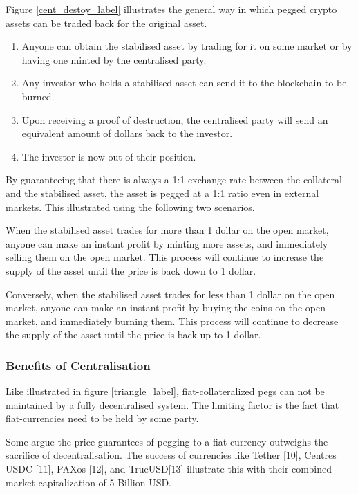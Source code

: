 \documentclass[english,]{IEEEtran}
\providecommand{\tightlist}{%
  \setlength{\itemsep}{0pt}\setlength{\parskip}{0pt}}
\begin{document}
Figure \ref{cent_destoy_label} illustrates the general way in which
pegged crypto assets can be traded back for the original asset.

\begin{enumerate}
\def\labelenumi{\arabic{enumi}.}
\setcounter{enumi}{-1}
\tightlist
\item
  Anyone can obtain the stabilised asset by trading for it on some
  market or by having one minted by the centralised party.
\item
  Any investor who holds a stabilised asset can send it to the
  blockchain to be burned.
\item
  Upon receiving a proof of destruction, the centralised party will send
  an equivalent amount of dollars back to the investor.
\item
  The investor is now out of their position.
\end{enumerate}

By guaranteeing that there is always a 1:1 exchange rate between the
collateral and the stabilised asset, the asset is pegged at a 1:1 ratio
even in external markets. This illustrated using the following two
scenarios.

When the stabilised asset trades for more than 1 dollar on the open
market, anyone can make an instant profit by minting more assets, and
immediately selling them on the open market. This process will continue
to increase the supply of the asset until the price is back down to 1
dollar.

Conversely, when the stabilised asset trades for less than 1 dollar on
the open market, anyone can make an instant profit by buying the coins
on the open market, and immediately burning them. This process will
continue to decrease the supply of the asset until the price is back up
to 1 dollar.

\hypertarget{benefits-of-centralisation}{%
\subsubsection{Benefits of
Centralisation}\label{benefits-of-centralisation}}

Like illustrated in figure \ref{triangle_label}, fiat-collateralized
pegs can not be maintained by a fully decentralised system. The limiting
factor is the fact that fiat-currencies need to be held by some party.

Some argue the price guarantees of pegging to a fiat-currency outweighs
the sacrifice of decentralisation. The success of currencies like Tether
{[}10{]}, Centres USDC {[}11{]}, PAXos {[}12{]}, and TrueUSD{[}13{]}
illustrate this with their combined market capitalization of 5 Billion
USD.
\end{document}
